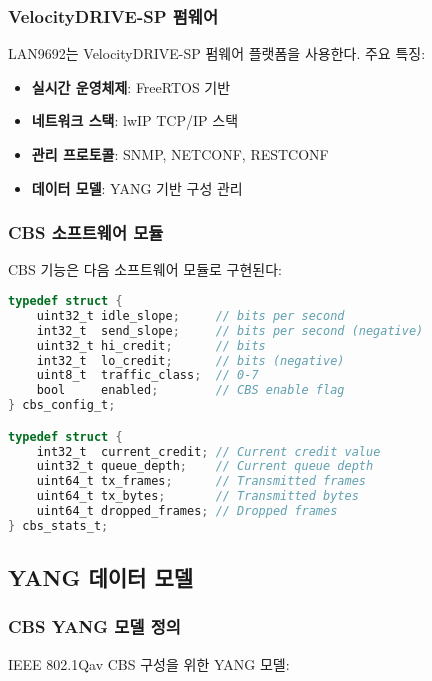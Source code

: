 \documentclass[twocolumn,10pt]{article}
\begin{document}
\subsubsection{VelocityDRIVE-SP 펌웨어}

LAN9692는 VelocityDRIVE-SP 펌웨어 플랫폼을 사용한다. 주요 특징:

\begin{itemize}
    \item \textbf{실시간 운영체제}: FreeRTOS 기반
    \item \textbf{네트워크 스택}: lwIP TCP/IP 스택
    \item \textbf{관리 프로토콜}: SNMP, NETCONF, RESTCONF
    \item \textbf{데이터 모델}: YANG 기반 구성 관리
\end{itemize}

\subsubsection{CBS 소프트웨어 모듈}

CBS 기능은 다음 소프트웨어 모듈로 구현된다:

\begin{lstlisting}[language=C, caption=CBS 구성 구조체]
typedef struct {
    uint32_t idle_slope;     // bits per second
    int32_t  send_slope;     // bits per second (negative)
    uint32_t hi_credit;      // bits
    int32_t  lo_credit;      // bits (negative)
    uint8_t  traffic_class;  // 0-7
    bool     enabled;        // CBS enable flag
} cbs_config_t;

typedef struct {
    int32_t  current_credit; // Current credit value
    uint32_t queue_depth;    // Current queue depth
    uint64_t tx_frames;      // Transmitted frames
    uint64_t tx_bytes;       // Transmitted bytes
    uint64_t dropped_frames; // Dropped frames
} cbs_stats_t;
\end{lstlisting}

\subsection{YANG 데이터 모델}

\subsubsection{CBS YANG 모델 정의}

IEEE 802.1Qav CBS 구성을 위한 YANG 모델:
\end{document}
